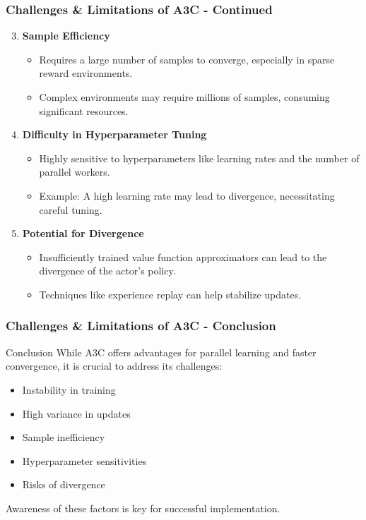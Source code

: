 \documentclass{beamer}
\begin{document}
\begin{frame}[fragile]
    \frametitle{Challenges \& Limitations of A3C - Continued}
    \begin{enumerate}
        \setcounter{enumi}{2} %
        \item \textbf{Sample Efficiency}
            \begin{itemize}
                \item Requires a large number of samples to converge, especially in sparse reward environments.
                \item Complex environments may require millions of samples, consuming significant resources.
            \end{itemize}
        
        \item \textbf{Difficulty in Hyperparameter Tuning}
            \begin{itemize}
                \item Highly sensitive to hyperparameters like learning rates and the number of parallel workers.
                \item Example: A high learning rate may lead to divergence, necessitating careful tuning.
            \end{itemize}
        
        \item \textbf{Potential for Divergence}
            \begin{itemize}
                \item Insufficiently trained value function approximators can lead to the divergence of the actor's policy.
                \item Techniques like experience replay can help stabilize updates.
            \end{itemize}
    \end{enumerate}
\end{frame}

\begin{frame}[fragile]
    \frametitle{Challenges \& Limitations of A3C - Conclusion}
    \begin{block}{Conclusion}
        While A3C offers advantages for parallel learning and faster convergence, it is crucial to address its challenges:
        \begin{itemize}
            \item Instability in training
            \item High variance in updates
            \item Sample inefficiency
            \item Hyperparameter sensitivities
            \item Risks of divergence
        \end{itemize}
        Awareness of these factors is key for successful implementation.
    \end{block}
\end{frame}
\end{document}

